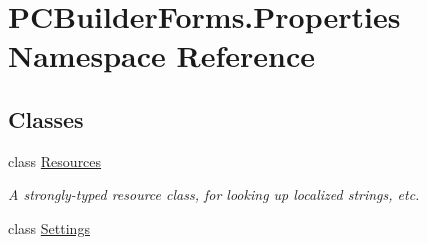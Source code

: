 \hypertarget{namespace_p_c_builder_forms_1_1_properties}{}\section{P\+C\+Builder\+Forms.\+Properties Namespace Reference}
\label{namespace_p_c_builder_forms_1_1_properties}
\subsection*{Classes}
\begin{DoxyCompactItemize}
\item 
class \hyperlink{class_p_c_builder_forms_1_1_properties_1_1_resources}{Resources}
\begin{DoxyCompactList}\small\item\em A strongly-\/typed resource class, for looking up localized strings, etc. \end{DoxyCompactList}\item 
class \hyperlink{class_p_c_builder_forms_1_1_properties_1_1_settings}{Settings}
\end{DoxyCompactItemize}
